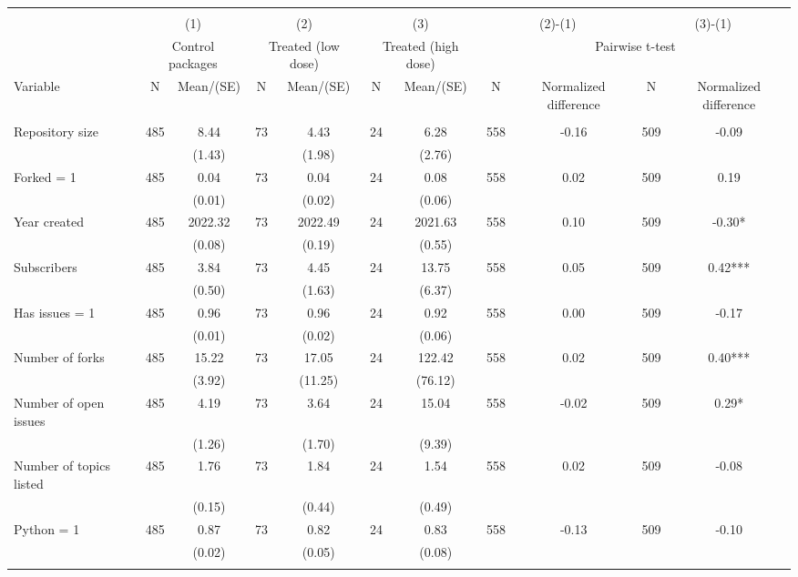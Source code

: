 \begin{tabular}{@{\extracolsep{5pt}}lcccccccccc}
\\[-1.8ex]\hline \hline \\[-1.8ex]
 & \multicolumn{2}{c}{(1)}  & \multicolumn{2}{c}{(2)}  & \multicolumn{2}{c}{(3)}  & \multicolumn{2}{c}{(2)-(1)} & \multicolumn{2}{c}{(3)-(1)} \\
 & \multicolumn{2}{c}{Control packages}  & \multicolumn{2}{c}{Treated (low dose)}  & \multicolumn{2}{c}{Treated (high dose)}  & \multicolumn{4}{c}{Pairwise t-test}  \\
Variable & N & Mean/(SE) & N & Mean/(SE) & N & Mean/(SE) & N & Normalized difference & N & Normalized difference \\ \hline \\[-1.8ex] 
Repository size   & 485    & 8.44    & 73    & 4.43    & 24    & 6.28    & 558    & -0.16    & 509    & -0.09   \\
 &   & (1.43)  &   & (1.98)  &   & (2.76)  &   &  &   &  \\ [1ex]
Forked = 1   & 485    & 0.04    & 73    & 0.04    & 24    & 0.08    & 558    & 0.02    & 509    & 0.19   \\
 &   & (0.01)  &   & (0.02)  &   & (0.06)  &   &  &   &  \\ [1ex]
Year created   & 485    & 2022.32    & 73    & 2022.49    & 24    & 2021.63    & 558    & 0.10    & 509    & -0.30*   \\
 &   & (0.08)  &   & (0.19)  &   & (0.55)  &   &  &   &  \\ [1ex]
Subscribers   & 485    & 3.84    & 73    & 4.45    & 24    & 13.75    & 558    & 0.05    & 509    & 0.42***   \\
 &   & (0.50)  &   & (1.63)  &   & (6.37)  &   &  &   &  \\ [1ex]
Has issues = 1   & 485    & 0.96    & 73    & 0.96    & 24    & 0.92    & 558    & 0.00    & 509    & -0.17   \\
 &   & (0.01)  &   & (0.02)  &   & (0.06)  &   &  &   &  \\ [1ex]
Number of forks   & 485    & 15.22    & 73    & 17.05    & 24    & 122.42    & 558    & 0.02    & 509    & 0.40***   \\
 &   & (3.92)  &   & (11.25)  &   & (76.12)  &   &  &   &  \\ [1ex]
Number of open issues   & 485    & 4.19    & 73    & 3.64    & 24    & 15.04    & 558    & -0.02    & 509    & 0.29*   \\
 &   & (1.26)  &   & (1.70)  &   & (9.39)  &   &  &   &  \\ [1ex]
Number of topics listed   & 485    & 1.76    & 73    & 1.84    & 24    & 1.54    & 558    & 0.02    & 509    & -0.08   \\
 &   & (0.15)  &   & (0.44)  &   & (0.49)  &   &  &   &  \\ [1ex]
Python = 1   & 485    & 0.87    & 73    & 0.82    & 24    & 0.83    & 558    & -0.13    & 509    & -0.10   \\
 &   & (0.02)  &   & (0.05)  &   & (0.08)  &   &  &   &  \\ [1ex]
\hline \hline \\[-1.8ex]

\end{tabular}
